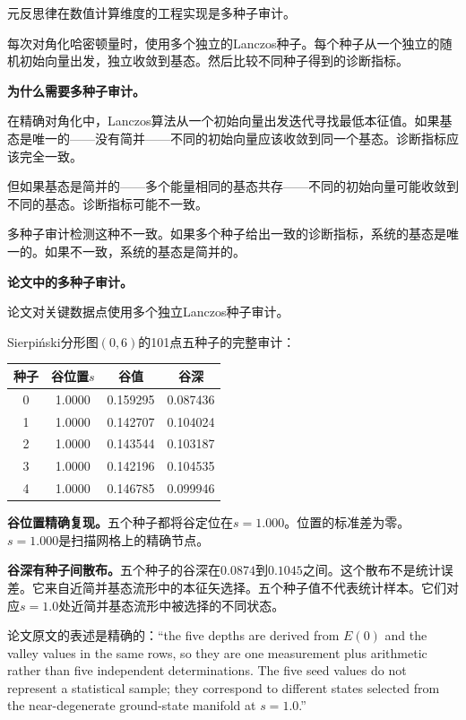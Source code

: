 \documentclass[11pt,a4paper]{book}
\theoremstyle{definition}
\begin{document}
元反思律在数值计算维度的工程实现是多种子审计。

每次对角化哈密顿量时，使用多个独立的Lanczos种子。每个种子从一个独立的随机初始向量出发，独立收敛到基态。然后比较不同种子得到的诊断指标。

\textbf{为什么需要多种子审计。}

在精确对角化中，Lanczos算法从一个初始向量出发迭代寻找最低本征值。如果基态是唯一的——没有简并——不同的初始向量应该收敛到同一个基态。诊断指标应该完全一致。

但如果基态是简并的——多个能量相同的基态共存——不同的初始向量可能收敛到不同的基态。诊断指标可能不一致。

多种子审计检测这种不一致。如果多个种子给出一致的诊断指标，系统的基态是唯一的。如果不一致，系统的基态是简并的。

\textbf{论文中的多种子审计。}

论文对关键数据点使用多个独立Lanczos种子审计。

Sierpiński分形图$(0,6)$的101点五种子的完整审计：

\begin{table}[h]
\centering
\begin{tabular}{cccc}
\toprule
种子 & 谷位置$s$ & 谷值 & 谷深 \\
\midrule
0 & 1.0000 & 0.159295 & 0.087436 \\
1 & 1.0000 & 0.142707 & 0.104024 \\
2 & 1.0000 & 0.143544 & 0.103187 \\
3 & 1.0000 & 0.142196 & 0.104535 \\
4 & 1.0000 & 0.146785 & 0.099946 \\
\bottomrule
\end{tabular}
\end{table}

\textbf{谷位置精确复现。}五个种子都将谷定位在$s=1.000$。位置的标准差为零。$s=1.000$是扫描网格上的精确节点。

\textbf{谷深有种子间散布。}五个种子的谷深在$0.0874$到$0.1045$之间。这个散布不是统计误差。它来自近简并基态流形中的本征矢选择。五个种子值不代表统计样本。它们对应$s=1.0$处近简并基态流形中被选择的不同状态。

论文原文的表述是精确的：“the five depths are derived from $E(0)$ and the valley values in the same rows, so they are one measurement plus arithmetic rather than five independent determinations. The five seed values do not represent a statistical sample; they correspond to different states selected from the near-degenerate ground-state manifold at $s=1.0$.”
\end{document}
